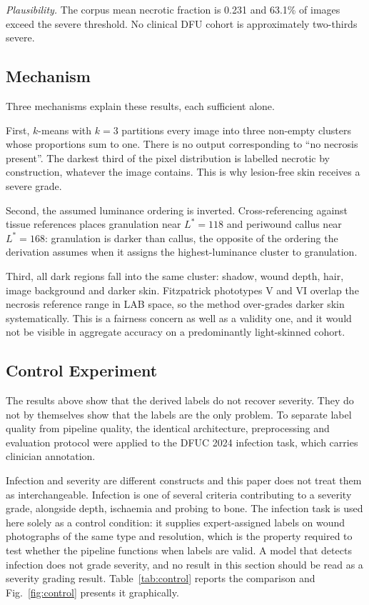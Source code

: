 \emph{Plausibility.} The corpus mean necrotic fraction is 0.231 and 63.1\%
of images exceed the severe threshold. No clinical DFU cohort is
approximately two-thirds severe.

\subsection{Mechanism}

Three mechanisms explain these results, each sufficient alone.

First, $k$-means with $k = 3$ partitions every image into three non-empty
clusters whose proportions sum to one. There is no output corresponding to
``no necrosis present''. The darkest third of the pixel distribution is
labelled necrotic by construction, whatever the image contains. This is why
lesion-free skin receives a severe grade.

Second, the assumed luminance ordering is inverted. Cross-referencing
against tissue references places granulation near $L^{*} = 118$ and
periwound callus near $L^{*} = 168$: granulation is darker than callus,
the opposite of the ordering the derivation assumes when it assigns the
highest-luminance cluster to granulation.

Third, all dark regions fall into the same cluster: shadow, wound depth,
hair, image background and darker skin. Fitzpatrick phototypes V and VI
\cite{fitzpatrick1988} overlap the necrosis reference range in LAB space,
so the method over-grades darker skin systematically. This is a fairness
concern as well as a validity one, and it would not be visible in aggregate
accuracy on a predominantly light-skinned cohort.

\subsection{Control Experiment}

The results above show that the derived labels do not recover severity.
They do not by themselves show that the labels are the only problem. To
separate label quality from pipeline quality, the identical architecture,
preprocessing and evaluation protocol were applied to the DFUC 2024
infection task, which carries clinician annotation.

Infection and severity are different constructs and this paper does not
treat them as interchangeable. Infection is one of several criteria
contributing to a severity grade, alongside depth, ischaemia and probing to
bone. The infection task is used here solely as a control condition: it
supplies expert-assigned labels on wound photographs of the same type and
resolution, which is the property required to test whether the pipeline
functions when labels are valid. A model that detects infection does not
grade severity, and no result in this section should be read as a severity
grading result.
Table~\ref{tab:control} reports the comparison and Fig.~\ref{fig:control}
presents it graphically.


